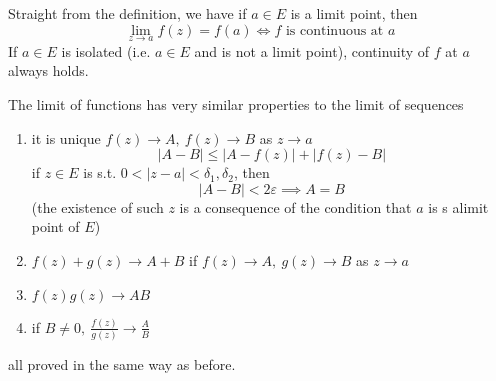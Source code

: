 \begin{remark}
Straight from the definition, we have if $a\in E$ is a limit point, then \[\lim_{z\to a}f(z) = f(a) \iff f\text{ is continuous at }a\]
If $a\in E$ is isolated (i.e. $a\in E$ and is not a limit point), continuity of $f$ at $a$ always holds.\\
\end{remark}
\begin{normal}
The limit of functions has very similar properties to the limit of sequences
\begin{enumerate}
    \item it is unique $f(z)\to A, \ f(z) \to B$ as $z\to a$
    \[|A-B|\leq |A-f(z)| + |f(z) - B|\]
    if $z\in E$ is s.t. $0 < |z-a| < \delta_1,\delta_2$, then
    \[|A-B|<2\varepsilon \implies A = B\]
    (the existence of such $z$ is a consequence of the condition that $a$ is s alimit point of $E$)
    \item $f(z) + g(z)\to A+B$ if $f(z) \to A, \ g(z) \to B$ as $z\to a$
    \item $f(z)g(z) \to AB$
    \item if $B\neq 0, \ \frac{f(z)}{g(z)}\to \frac{A}{B}$ 
\end{enumerate}
all proved in the same way as before.
\end{normal}
